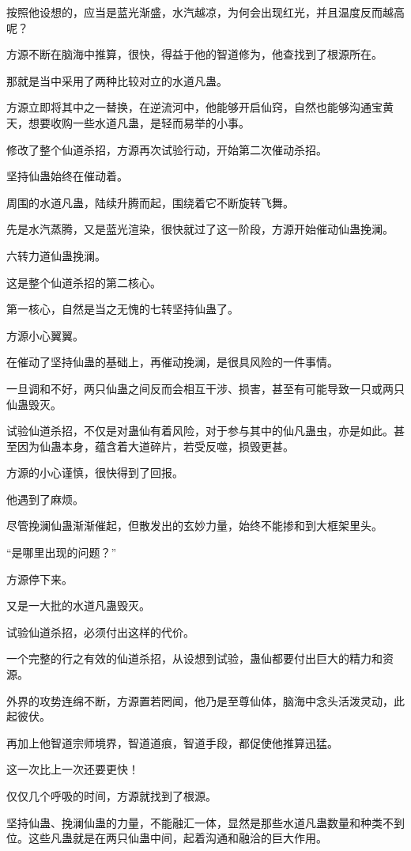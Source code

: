 \begin{this_body}
按照他设想的，应当是蓝光渐盛，水汽越凉，为何会出现红光，并且温度反而越高呢？

方源不断在脑海中推算，很快，得益于他的智道修为，他查找到了根源所在。

那就是当中采用了两种比较对立的水道凡蛊。

方源立即将其中之一替换，在逆流河中，他能够开启仙窍，自然也能够沟通宝黄天，想要收购一些水道凡蛊，是轻而易举的小事。

修改了整个仙道杀招，方源再次试验行动，开始第二次催动杀招。

坚持仙蛊始终在催动着。

周围的水道凡蛊，陆续升腾而起，围绕着它不断旋转飞舞。

先是水汽蒸腾，又是蓝光渲染，很快就过了这一阶段，方源开始催动仙蛊挽澜。

六转力道仙蛊挽澜。

这是整个仙道杀招的第二核心。

第一核心，自然是当之无愧的七转坚持仙蛊了。

方源小心翼翼。

在催动了坚持仙蛊的基础上，再催动挽澜，是很具风险的一件事情。

一旦调和不好，两只仙蛊之间反而会相互干涉、损害，甚至有可能导致一只或两只仙蛊毁灭。

试验仙道杀招，不仅是对蛊仙有着风险，对于参与其中的仙凡蛊虫，亦是如此。甚至因为仙蛊本身，蕴含着大道碎片，若受反噬，损毁更甚。

方源的小心谨慎，很快得到了回报。

他遇到了麻烦。

尽管挽澜仙蛊渐渐催起，但散发出的玄妙力量，始终不能掺和到大框架里头。

“是哪里出现的问题？”

方源停下来。

又是一大批的水道凡蛊毁灭。

试验仙道杀招，必须付出这样的代价。

一个完整的行之有效的仙道杀招，从设想到试验，蛊仙都要付出巨大的精力和资源。

外界的攻势连绵不断，方源置若罔闻，他乃是至尊仙体，脑海中念头活泼灵动，此起彼伏。

再加上他智道宗师境界，智道道痕，智道手段，都促使他推算迅猛。

这一次比上一次还要更快！

仅仅几个呼吸的时间，方源就找到了根源。

坚持仙蛊、挽澜仙蛊的力量，不能融汇一体，显然是那些水道凡蛊数量和种类不到位。这些凡蛊就是在两只仙蛊中间，起着沟通和融洽的巨大作用。


\end{this_body}
